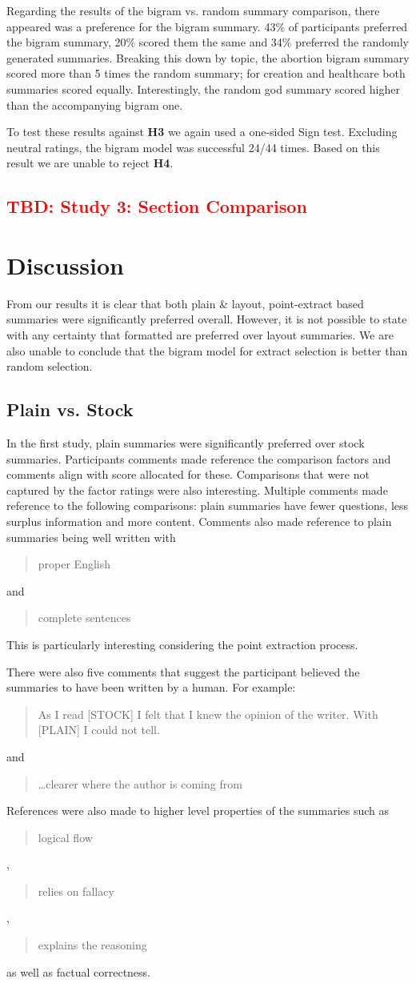       Regarding the results of the bigram vs. random summary comparison, there appeared was a preference for the bigram summary. 43\% of participants preferred the bigram summary, 20\% scored them the same and 34\% preferred the randomly generated summaries. Breaking this down by topic, the abortion bigram summary scored more than 5 times the random summary; for creation and healthcare both summaries scored equally. Interestingly, the random god summary scored higher than the accompanying bigram one.

      To test these results against \textbf{H3} we again used a one-sided Sign test. Excluding neutral ratings, the bigram model was successful 24/44 times. Based on this result we are unable to reject \textbf{H4}.

    \subsection{\textcolor{red}{TBD: Study 3: Section Comparison}}

  \section{Discussion}
    From our results it is clear that both plain \& layout, point-extract based summaries were significantly preferred overall. However, it is not possible to state with any certainty that formatted are preferred over layout summaries. We are also unable to conclude that the bigram model for extract selection is better than random selection.

    \subsection{Plain vs. Stock}
      In the first study, plain summaries were significantly preferred over stock summaries. Participants comments made reference the comparison factors and comments align with score allocated for these. Comparisons that were not captured by the factor ratings were also interesting. Multiple comments made reference to the following comparisons: plain summaries have fewer questions, less surplus information and more content. Comments also made reference to plain summaries being well written with \blockquote{proper English} and \blockquote{complete sentences}. This is particularly interesting considering the point extraction process.

      There were also five comments that suggest the participant believed the summaries to have been written by a human. For example: \blockquote{As I read [STOCK] I felt that I knew the opinion of the writer. With [PLAIN] I could not tell.} and \blockquote{\dots clearer where the author is coming from}. References were also made to higher level properties of the summaries such as \blockquote{logical flow}, \blockquote{relies on fallacy}, \blockquote{explains the reasoning} as well as factual correctness.

